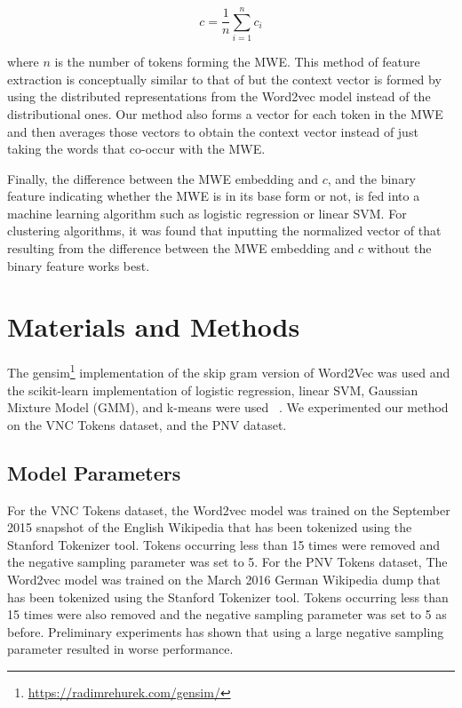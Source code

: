 \documentclass[11pt]{article}
\begin{document}
\begin{equation}
c = \frac{1}{n} \sum_{i=1}^{n} c_i
\end{equation}

where $n$ is the number of tokens forming the MWE. This method of feature extraction is conceptually similar to that of \cite{fazly2009unsupervised} but the context vector is formed by using the distributed representations from the Word2vec model instead of the distributional ones. Our method also forms a vector for each token in the MWE and then averages those vectors to obtain the context vector instead of just taking the words that co-occur with the MWE.

Finally, the difference between the MWE embedding and $c$, and the binary feature indicating whether the MWE is in its base form or not, is fed into a machine learning algorithm such as logistic regression or linear SVM. For clustering algorithms, it was found that inputting the normalized vector of that resulting from the difference between the MWE embedding and $c$ without the binary feature works best.

\section{Materials and Methods}

The gensim\footnote{\url{https://radimrehurek.com/gensim/}} implementation of the skip gram version of Word2Vec was used and the scikit-learn implementation of logistic regression, linear SVM, Gaussian Mixture Model (GMM), and k-means were used ~\cite{pedregosa2011scikit}. We experimented our method on the VNC Tokens dataset, and the PNV dataset. 

\subsection{Model Parameters}

For the VNC Tokens dataset, the Word2vec model was trained on the September 2015 snapshot of the English Wikipedia that has been tokenized using the Stanford Tokenizer tool. Tokens occurring less than 15 times were removed and the negative sampling parameter was set to 5. For the PNV Tokens dataset, The Word2vec model was trained on the March 2016 German Wikipedia dump that has been tokenized using the Stanford Tokenizer tool. Tokens occurring less than 15 times were also removed and the negative sampling parameter was set to 5 as before. Preliminary experiments has shown that using a large negative sampling parameter resulted in worse performance.
\end{document}
